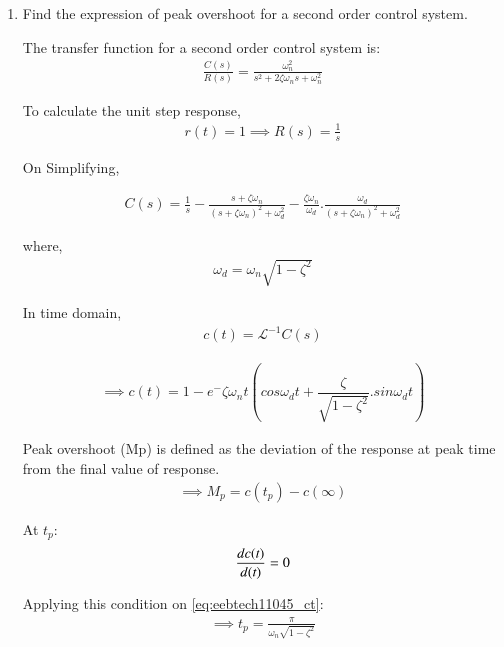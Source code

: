 \begin{enumerate}[label=\thesubsection.\arabic*.,ref=\thesubsection.\theenumi]

\item Find the expression of peak overshoot for a second order control system.

\solution

The transfer function for a second order control system is:
\begin{align}
    \frac{C(s)}{R(s)}= \frac{\omega_n^2}{s^2 + 2\zeta\omega_ns + \omega_n^2}
\end{align}

To calculate the unit step response,
\begin{align}
    r(t) = 1 \implies R(s) = \frac{1}{s}    
\end{align}

On Simplifying, 

\begin{align}
    C(s) = \frac{1}{s}-\frac{s+\zeta\omega_n}{(s + \zeta\omega_n)^2 + \omega_d^2} - \frac{\zeta\omega_n}{\omega_d}.\frac{\omega_d}{(s + \zeta\omega_n)^2 + \omega_d^2}  
\end{align}

where, 
\begin{align}
    \omega_d=\omega_n\sqrt{1-\zeta^2}
\end{align}

In time domain, 
\begin{align}
    c(t) = \mathcal{L}^{-1}{C(s)}
\end{align}

\begin{align}
    \implies
    c(t) = 1 - e^-\zeta\omega_nt(cos\omega_dt+\dfrac{\zeta}{\sqrt{1-\zeta^2}}.sin\omega_dt)
    \label{eq:eebtech11045_ct}
\end{align}

Peak overshoot (Mp) is defined as the deviation of the response at peak time from the final value of response.
\begin{align}
    \implies M_p = c(t_p) - c(\infty)
    \label{eq:eebtech11045_Mp}
\end{align}

At $t_p$:
\begin{align}
    \frac{dc(\emph{t})}{d(\emph{t})} = 0
\end{align}

Applying this condition on \eqref{eq:eebtech11045_ct}:
\begin{align}
    \implies t_p = \frac{\pi}{\omega_n\sqrt{1-\zeta^2}}
\end{align}


\end{enumerate}
